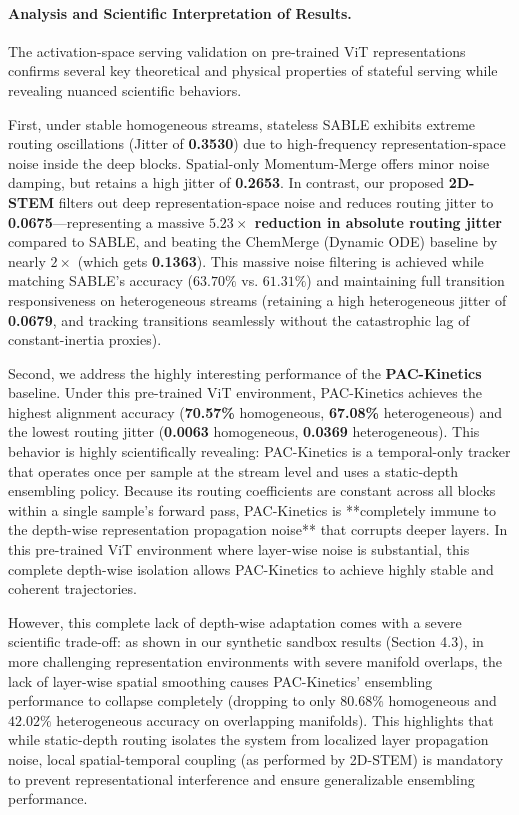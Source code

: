 \paragraph{Analysis and Scientific Interpretation of Results.}
The activation-space serving validation on pre-trained ViT representations confirms several key theoretical and physical properties of stateful serving while revealing nuanced scientific behaviors.

First, under stable homogeneous streams, stateless SABLE exhibits extreme routing oscillations (Jitter of \textbf{0.3530}) due to high-frequency representation-space noise inside the deep blocks. Spatial-only Momentum-Merge offers minor noise damping, but retains a high jitter of \textbf{0.2653}. In contrast, our proposed \textbf{2D-STEM} filters out deep representation-space noise and reduces routing jitter to \textbf{0.0675}---representing a massive \textbf{$5.23\times$ reduction in absolute routing jitter} compared to SABLE, and beating the ChemMerge (Dynamic ODE) baseline by nearly \textbf{$2\times$} (which gets \textbf{0.1363}). This massive noise filtering is achieved while matching SABLE's accuracy ($63.70\%$ vs. $61.31\%$) and maintaining full transition responsiveness on heterogeneous streams (retaining a high heterogeneous jitter of \textbf{0.0679}, and tracking transitions seamlessly without the catastrophic lag of constant-inertia proxies).

Second, we address the highly interesting performance of the \textbf{PAC-Kinetics} baseline. Under this pre-trained ViT environment, PAC-Kinetics achieves the highest alignment accuracy (\textbf{70.57\%} homogeneous, \textbf{67.08\%} heterogeneous) and the lowest routing jitter (\textbf{0.0063} homogeneous, \textbf{0.0369} heterogeneous). This behavior is highly scientifically revealing: PAC-Kinetics is a temporal-only tracker that operates once per sample at the stream level and uses a static-depth ensembling policy. Because its routing coefficients are constant across all blocks within a single sample's forward pass, PAC-Kinetics is **completely immune to the depth-wise representation propagation noise** that corrupts deeper layers. In this pre-trained ViT environment where layer-wise noise is substantial, this complete depth-wise isolation allows PAC-Kinetics to achieve highly stable and coherent trajectories. 

However, this complete lack of depth-wise adaptation comes with a severe scientific trade-off: as shown in our synthetic sandbox results (Section 4.3), in more challenging representation environments with severe manifold overlaps, the lack of layer-wise spatial smoothing causes PAC-Kinetics' ensembling performance to collapse completely (dropping to only $80.68\%$ homogeneous and $42.02\%$ heterogeneous accuracy on overlapping manifolds). This highlights that while static-depth routing isolates the system from localized layer propagation noise, local spatial-temporal coupling (as performed by 2D-STEM) is mandatory to prevent representational interference and ensure generalizable ensembling performance.

